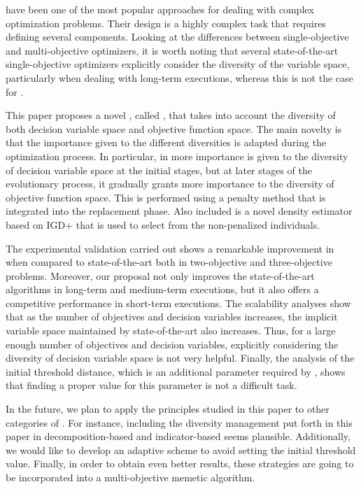 \EAS{} have been one of the most popular approaches for dealing with complex optimization problems.
%
Their design is a highly complex task that requires defining several components.
%
Looking at the differences between single-objective and multi-objective optimizers, it is worth noting
that several state-of-the-art single-objective optimizers explicitly consider the diversity of the variable space, particularly
when dealing with long-term executions, whereas this is not the case for \MOEAS{}.

This paper proposes a novel \MOEA{}, called \VSDMOEA{}, that takes into account the diversity of both decision variable space
and objective function space.
%
The main novelty is that the importance given to the different diversities is adapted during the optimization process.
%
In particular, in \VSDMOEA{} more importance is given to the diversity of decision variable space at the initial stages,
but at later stages of the evolutionary process, it gradually grants more importance to the diversity of 
objective function space.
%
This is performed using a penalty method that is integrated into the replacement phase.
%
Also included is a novel density estimator based on IGD+ that is used to select from the non-penalized individuals.

The experimental validation carried out shows a remarkable improvement in \VSDMOEA{} when compared 
to state-of-the-art \MOEAS{} both in two-objective and three-objective problems.
%
Moreover, our proposal not only improves the state-of-the-art algorithms in long-term and medium-term executions,
but it also offers a competitive performance in short-term executions.
%
The scalability analyses show that as the number of objectives and decision variables increases, 
the implicit variable space maintained by state-of-the-art
\MOEAS{} also increases.
%
Thus, for a large enough number of objectives and decision variables, explicitly considering the diversity of decision 
variable space is not very helpful.
%
Finally, the analysis of the initial threshold distance, which is an additional parameter required by \VSDMOEA{}, 
shows that finding a proper value for this parameter is not a difficult task.

In the future, we plan to apply the principles studied in this paper to other categories of \MOEAS{}.
%
For instance, including the diversity management put forth in this paper in decomposition-based and indicator-based \MOEAS{} seems plausible.
%
Additionally, we would like to develop an adaptive scheme to avoid setting the initial threshold value.
%
Finally, in order to obtain even better results, these strategies are going to be incorporated into a multi-objective memetic algorithm.
%
